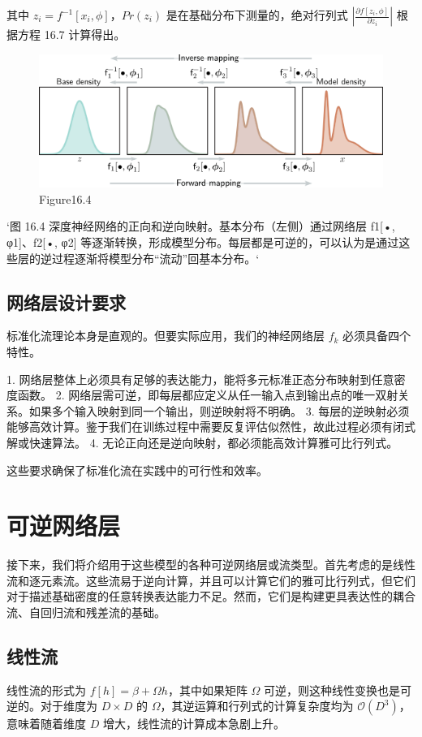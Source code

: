 其中 \(z_i = f^{-1}[x_i, \phi]\)，\(Pr(z_i)\) 是在基础分布下测量的，绝对行列式 \(\left| \frac{\partial f[z_i, \phi]}{\partial z_i} \right|\) 根据方程 16.7 计算得出。

\begin{figure}[h!]
\centering
\includegraphics[width=0.7\linewidth]{png/chapter16/FlowTransformLayers.png}
\caption{Figure16.4}
\end{figure}

`图 16.4 深度神经网络的正向和逆向映射。基本分布（左侧）通过网络层 f1[•, φ1]、f2[•, φ2] 等逐渐转换，形成模型分布。每层都是可逆的，可以认为是通过这些层的逆过程逐渐将模型分布“流动”回基本分布。`

\subsection{网络层设计要求}
标准化流理论本身是直观的。但要实际应用，我们的神经网络层 \(f_k\) 必须具备四个特性。

1. 网络层整体上必须具有足够的表达能力，能将多元标准正态分布映射到任意密度函数。
2. 网络层需可逆，即每层都应定义从任一输入点到输出点的唯一双射关系。如果多个输入映射到同一个输出，则逆映射将不明确。
3. 每层的逆映射必须能够高效计算。鉴于我们在训练过程中需要反复评估似然性，故此过程必须有闭式解或快速算法。
4. 无论正向还是逆向映射，都必须能高效计算雅可比行列式。

这些要求确保了标准化流在实践中的可行性和效率。
\section{可逆网络层}

接下来，我们将介绍用于这些模型的各种可逆网络层或流类型。首先考虑的是线性流和逐元素流。这些流易于逆向计算，并且可以计算它们的雅可比行列式，但它们对于描述基础密度的任意转换表达能力不足。然而，它们是构建更具表达性的耦合流、自回归流和残差流的基础。

\subsection{线性流}
线性流的形式为 \(f[h] = \beta + \Omega h\)，其中如果矩阵 \(\Omega\) 可逆，则这种线性变换也是可逆的。对于维度为 \(D \times D\) 的 \(\Omega\)，其逆运算和行列式的计算复杂度均为 \(\mathcal{O}(D^3)\)，意味着随着维度 \(D\) 增大，线性流的计算成本急剧上升。

